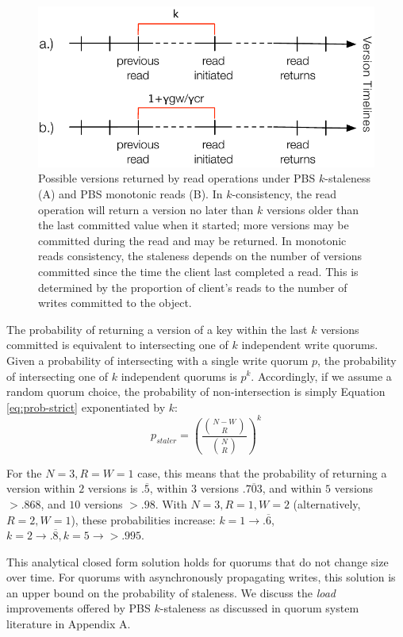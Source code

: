 \documentclass{vldb}
\begin{document}
\begin{figure}
\centering
\includegraphics[width=\columnwidth]{figs/timelines.pdf}
\caption{Possible versions returned by read operations under
  PBS $k$-staleness (A) and PBS monotonic reads (B). In
  $k$-consistency, the read operation will return a version no later
  than $k$ versions older than the last committed value when it
  started; more versions may be committed during the read and may be
  returned.  In monotonic reads consistency, the staleness depends on
  the number of versions committed since the time the client last
  completed a read.  This is determined by the proportion of client's
  reads to the number of writes committed to the object.}
\label{fig:timelines}
\end{figure}

The probability of returning a version of a key within the last $k$
versions committed is equivalent to intersecting one of $k$
independent write quorums.  Given a probability of intersecting with a
single write quorum $p$, the probability of intersecting one of $k$
independent quorums is $p^k$.  Accordingly, if we assume a random
quorum choice, the probability of non-intersection is simply Equation
\ref{eq:prob-strict} exponentiated by $k$:
\begin{equation}
\label{eq:k-consistency}
p_{staler} = \left(\frac{{N-W \choose R}}{{N \choose R}}\right)^k
\end{equation}

For the $N=3, R=W=1$ case, this means that the probability of
returning a version within $2$ versions is $.\overline{5}$, within $3$
versions $.\overline{703}$, and within $5$ versions $> .868$, and $10$
versions $>.98$.  With $N=3, R=1, W=2$ (alternatively, $R=2, W=1$),
these probabilities increase: $k=1 \rightarrow
.\overline{6}$, $k=2 \rightarrow .\overline{8}, k=5 \rightarrow >
.995$.

This analytical closed form solution holds for quorums that do not
change size over time.  For quorums with asynchronously propagating
writes, this solution is an upper bound on the probability of
staleness.  We discuss the \textit{load} improvements offered by PBS
$k$-staleness as discussed in quorum system literature in Appendix A.
\end{document}
